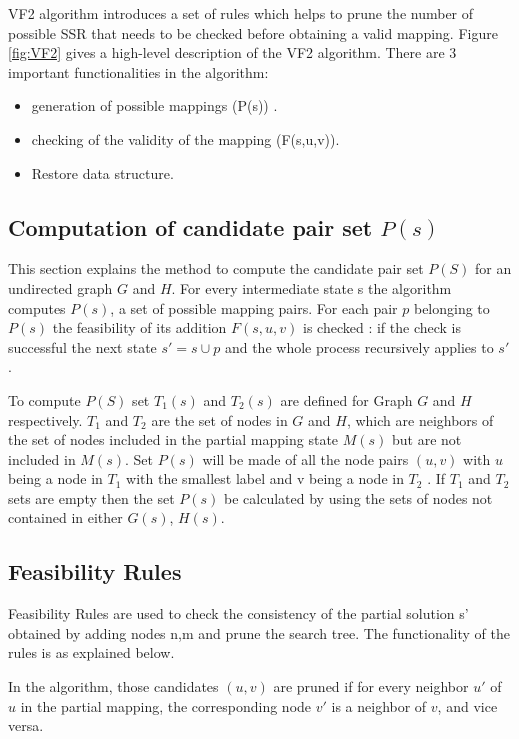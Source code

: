 VF2 algorithm introduces a set of rules which helps to prune the number of possible SSR that needs to be checked before obtaining a valid mapping. Figure \ref{fig:VF2} gives a high-level description of the VF2 algorithm.
There are 3 important functionalities in the algorithm: 
\begin{itemize}
\item generation of possible mappings (P(s)) .
\item checking of the validity of the mapping (F(s,u,v)).
\item Restore data structure.
\end{itemize}



\subsection{Computation of candidate pair set $P(s)$}
This section explains the method to compute the candidate pair set $P(S)$ for an undirected graph $G$ and $H$. 
For every intermediate state s the algorithm computes $P(s)$, a set of possible mapping pairs. For each pair $p$ belonging to $P(s)$ the feasibility of its addition $F(s,u,v)$ is checked : if the check is successful the next state $s' = s \cup p$ and the whole process recursively applies to $s'$.

To compute $P(S)$ set $T_1(s)$ and $T_2(s)$ are defined for Graph $G$ and $H$ respectively. $T_1$ and $T_2$ are the set of  nodes in $G$ and $H$, which are neighbors of the set of nodes included in the partial mapping state $M(s)$ but are not included in $M(s)$.
Set $P(s)$ will be made of all the node pairs $(u,v)$ with $u$ being a node in $T_1$ with the smallest label  and v being a node in $T_2$ . If  $T_1$ and $T_2$ sets are empty then the set $P(s)$ be calculated by using the sets of nodes not contained in either $G(s)$, $H(s)$.

\subsection{Feasibility Rules}
Feasibility Rules are used to check the consistency of the partial solution s' obtained by adding nodes n,m and prune the search tree. The functionality of the rules is as explained below.

In the algorithm, those candidates $(u,v)$ are pruned if for every neighbor $u'$ of $u$ in the partial mapping, the corresponding node $v'$ is a neighbor of $v$, and vice versa.

